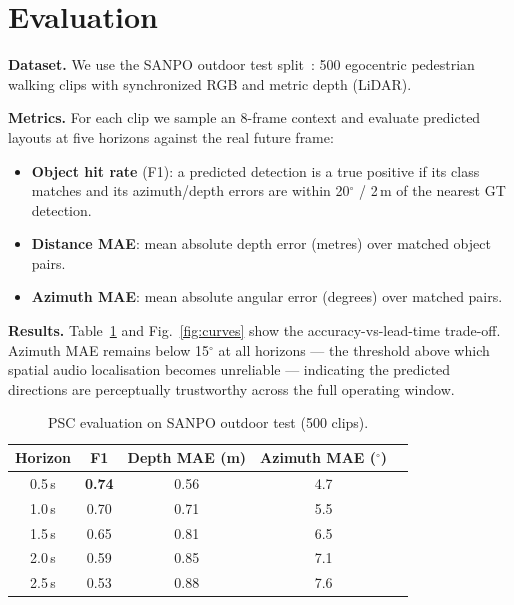 \documentclass[letterpaper, 10pt, conference]{ieeeconf}
\begin{document}
\section{Evaluation}

\textbf{Dataset.}
We use the SANPO outdoor test split~\cite{sanpo2025}: 500 ego\-centric
pedestrian walking clips with synchronized RGB and metric depth (LiDAR).

\textbf{Metrics.}
For each clip we sample an 8-frame context and evaluate predicted layouts
at five horizons against the real future frame:

\begin{itemize}
  \item \textbf{Object hit rate} (F1): a predicted detection is a true
    positive if its class matches and its azimuth/depth errors are within
    20$^\circ$ / 2\,m of the nearest GT detection.
  \item \textbf{Distance MAE}: mean absolute depth error (metres) over
    matched object pairs.
  \item \textbf{Azimuth MAE}: mean absolute angular error (degrees)
    over matched pairs.
\end{itemize}

\textbf{Results.}
Table~\ref{tab:results} and Fig.~\ref{fig:curves} show the
accuracy-vs-lead-time trade-off.  Azimuth MAE remains below 15$^\circ$
at all horizons — the threshold above which spatial audio localisation
becomes unreliable — indicating the predicted directions are perceptually
trustworthy across the full operating window.

\begin{table}[h]
\centering
\caption{PSC evaluation on SANPO outdoor test (500 clips).}
\label{tab:results}
\vspace{-2pt}
\setlength{\tabcolsep}{5pt}
\small
\begin{tabular}{ccccc}
\toprule
Horizon & F1 & Depth MAE (m) & Azimuth MAE ($^\circ$) \\
\midrule
0.5\,s & \textbf{0.74} & 0.56 & 4.7 \\
1.0\,s & 0.70          & 0.71 & 5.5 \\
1.5\,s & 0.65          & 0.81 & 6.5 \\
2.0\,s & 0.59          & 0.85 & 7.1 \\
2.5\,s & 0.53          & 0.88 & 7.6 \\
\bottomrule
\end{tabular}
\vspace{-4pt}
\end{table}
\end{document}
